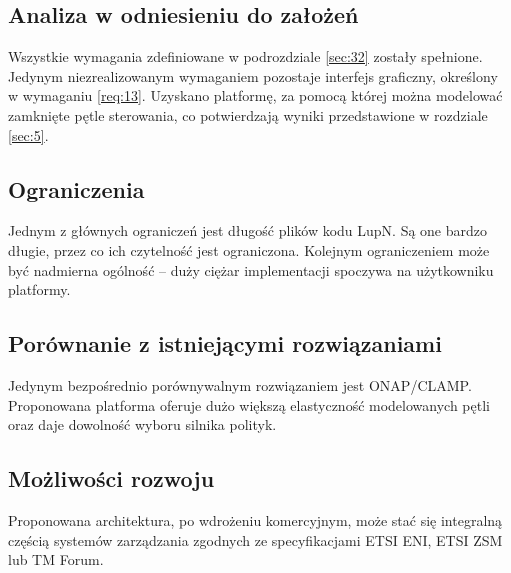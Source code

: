 \subsection{Analiza w odniesieniu do założeń} 

Wszystkie wymagania zdefiniowane w podrozdziale \ref{sec:32} zostały spełnione. Jedynym niezrealizowanym wymaganiem pozostaje interfejs graficzny, określony w wymaganiu \ref{req:13}. Uzyskano platformę, za pomocą której można modelować zamknięte pętle sterowania, co potwierdzają wyniki przedstawione w rozdziale \ref{sec:5}. 

\subsection{Ograniczenia}

Jednym z głównych ograniczeń jest długość plików kodu LupN. Są one bardzo długie, przez co ich czytelność jest ograniczona. Kolejnym ograniczeniem może być nadmierna ogólność – duży ciężar implementacji spoczywa na użytkowniku platformy.

\subsection{Porównanie z istniejącymi rozwiązaniami}

Jedynym bezpośrednio porównywalnym rozwiązaniem jest ONAP/CLAMP. Proponowana platforma oferuje dużo większą elastyczność modelowanych pętli oraz daje dowolność wyboru silnika polityk.

\subsection{Możliwości rozwoju}

Proponowana architektura, po wdrożeniu komercyjnym, może stać się integralną częścią systemów zarządzania zgodnych ze specyfikacjami ETSI ENI, ETSI ZSM lub TM Forum.

